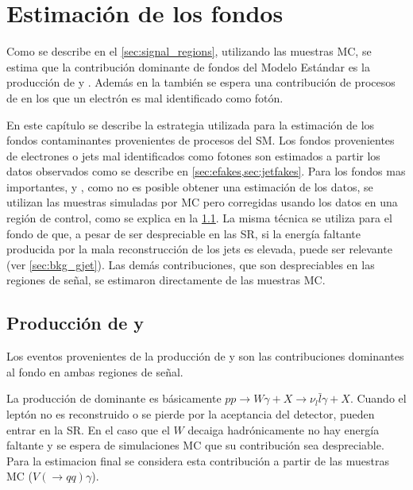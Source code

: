 \chapter{Estimación de los fondos} \label{cap:fondos}

Como se describe en el \cref{sec:signal_regions}, utilizando las
muestras MC, se estima que la contribución dominante de fondos del Modelo
Estándar es la producción de {\wgam} y {\ttgam}. Además en la {\SRL} también se
espera una contribución de procesos de {\ttbar} en los que un electrón es mal
identificado como fotón.

En este capítulo se describe la estrategia utilizada para la estimación de los
fondos contaminantes provenientes de procesos del SM.
Los fondos provenientes de electrones o jets mal identificados como fotones son
estimados a partir los datos observados como se describe en
\cref{sec:efakes,sec:jetfakes}. Para los fondos mas importantes, {\wgam} y
{\ttgam}, como no es posible obtener una estimación de los datos, se
utilizan las muestras simuladas por MC pero corregidas usando los datos en
una región de control, como se explica en la \cref{sec:bkg_wgam_ttgam}. La
misma técnica se utiliza para el fondo de {\gjet} que, a pesar de ser
despreciable en las SR, si la energía faltante producida por la mala
reconstrucción de los jets es elevada, puede ser relevante (ver
\cref{sec:bkg_gjet}). Las demás contribuciones, que son despreciables en
las regiones de señal, se estimaron directamente de las muestras MC.



\section[Producción de {\wgam} y $tt\gamma$]{Producción de {\wgam} y {\ttgam}}
\label{sec:bkg_wgam_ttgam}

Los eventos provenientes de la producción de {\wgam} y {\ttgam} son las
contribuciones dominantes al fondo en ambas regiones de señal.

La producción de {\wgam} dominante es básicamente $pp \to W\gamma + X \to \nu_l
\bar{l}\gamma + X$. Cuando el leptón no es reconstruido o se pierde por la
aceptancia del detector, pueden entrar en la SR. En el caso que el $W$
decaiga hadrónicamente no hay energía faltante y se espera de simulaciones MC que
su contribución sea despreciable. Para la estimacion final se considera
esta contribución a partir de las muestras MC ($V(\to qq)\gamma$).

